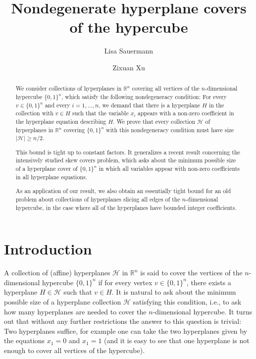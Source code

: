 \documentclass{amsart}
\title
{Nondegenerate hyperplane covers of the hypercube}
\author{Lisa Sauermann}
\author{Zixuan Xu}
\theoremstyle{remark}
\numberwithin{theorem}{section}
\renewcommand{\(}{\bigl(}
\renewcommand{\)}{\bigr)\vphantom{)}}
\newcommand{\cH}{\mathcal H}
\renewcommand{\ge}{\geqslant}
\newcommand{\R}{\mathbb R}
\newcommand{\bin}{\{0,1\}}
\begin{document}
\begin{abstract}
We consider collections of hyperplanes in $\mathbb{R}^n$ covering all vertices of the $n$-dimensional hypercube $\{0,1\}^n$, which satisfy the following nondegeneracy condition: For every $v\in \{0,1\}^n$ and every $i=1,\dots,n$, we demand that there is a hyperplane $H$ in the collection with $v\in H$ such that the variable $x_i$ appears with a non-zero coefficient in the hyperplane equation describing $H$. We prove that every collection $\mathcal{H}$ of hyperplanes in $\mathbb{R}^n$ covering $\{0,1\}^n$ with this nondegeneracy condition must have size $|\mathcal{H}|\ge n/2$.

This bound is tight up to constant factors. It generalizes a recent result concerning the intensively studied skew covers problem, which asks about the minimum possible size of a hyperplane cover of $\{0,1\}^n$ in which all variables appear with non-zero coefficients in all hyperplane equations.

As an application of our result, we also obtain an essentially tight bound for an old problem about collections of hyperplanes slicing all edges of the $n$-dimensional hypercube, in the case where all of the hyperplanes have bounded integer coefficients.

\end{abstract}
		
\maketitle


\vspace{-2em}

\section{Introduction}

A collection of (affine) hyperplanes $\cH$ in $\R^n$ is said to cover the vertices of the $n$-dimensional hypercube $\bin^n$ if for every vertex $v\in \bin^n$, there exists a hyperplane $H\in \cH$ such that $v\in H$. It is natural to ask about the minimum possible size of a hyperplane collection $\cH$ satisfying this condition, i.e., to ask how many hyperplanes are needed to cover the $n$-dimensional hypercube. It turns out that without any further restrictions the answer to this question is trivial: Two hyperplanes suffice, for example one can take the two hyperplanes given by the equations $x_1 = 0$ and $x_1 = 1$ (and it is easy to see that one hyperplane is not enough to cover all vertices of the hypercube).
\end{document}
